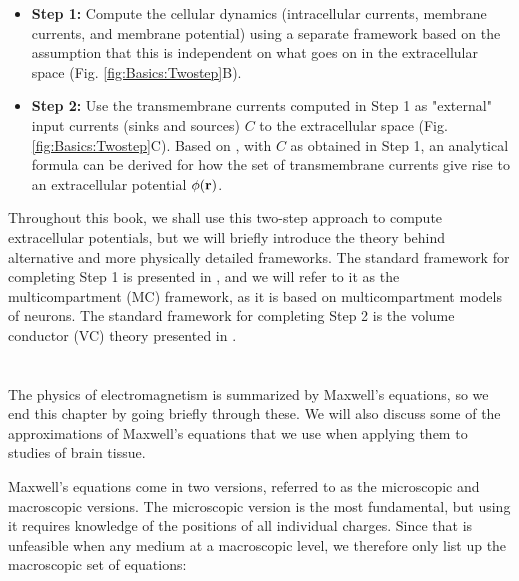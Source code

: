 \begin{itemize}
\item {\bf Step 1:} Compute the cellular dynamics (intracellular currents, membrane currents, and membrane potential) using a separate framework based on the assumption that this is independent on what goes on in the extracellular space (Fig. \ref{fig:Basics:Twostep}B).

\item {\bf Step 2:} Use the transmembrane currents computed in Step 1 as "external" input currents (sinks and sources) $C$ to the extracellular space (Fig. \ref{fig:Basics:Twostep}C). Based on , with $C$ as obtained in Step 1, an analytical formula can be derived for how the set of transmembrane currents give rise to an extracellular potential $\phi({\bf r})$.
\end{itemize}

Throughout this book, we shall use this two-step approach to compute extracellular potentials, but we will briefly introduce the theory behind alternative and more physically detailed frameworks. The standard framework for completing Step 1 is presented in , and we will refer to it as the multicompartment (MC) framework, as it is based on multicompartment models of neurons. The standard framework for completing Step 2 is the volume conductor (VC) theory presented in  .



\section{}
\label{sec:Basics:Maxwell} 
The physics of electromagnetism is summarized by Maxwell's equations, so we end this chapter by going briefly through these. We will also discuss some of the approximations of Maxwell's equations that we use when applying them to studies of brain tissue.

Maxwell's equations come in two versions, referred to as the microscopic and macroscopic versions. The microscopic version is the most fundamental, but using it requires knowledge of the positions of all individual charges. Since that is unfeasible when any medium at a macroscopic level, we therefore only list up the macroscopic set of equations:

